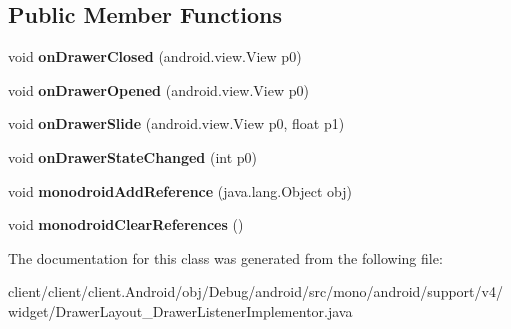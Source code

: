 \subsection*{Public Member Functions}
\begin{DoxyCompactItemize}
\item 
\hypertarget{classmono_1_1android_1_1support_1_1v4_1_1widget_1_1DrawerLayout__DrawerListenerImplementor_a19da95bb5c1e94a6af928960ad0ed455}{}void {\bfseries on\+Drawer\+Closed} (android.\+view.\+View p0)\label{classmono_1_1android_1_1support_1_1v4_1_1widget_1_1DrawerLayout__DrawerListenerImplementor_a19da95bb5c1e94a6af928960ad0ed455}

\item 
\hypertarget{classmono_1_1android_1_1support_1_1v4_1_1widget_1_1DrawerLayout__DrawerListenerImplementor_afca9c99baf632ae1efb1836cb29da6f4}{}void {\bfseries on\+Drawer\+Opened} (android.\+view.\+View p0)\label{classmono_1_1android_1_1support_1_1v4_1_1widget_1_1DrawerLayout__DrawerListenerImplementor_afca9c99baf632ae1efb1836cb29da6f4}

\item 
\hypertarget{classmono_1_1android_1_1support_1_1v4_1_1widget_1_1DrawerLayout__DrawerListenerImplementor_a9895b1e0ad123b4ba0bf63c1daa47da1}{}void {\bfseries on\+Drawer\+Slide} (android.\+view.\+View p0, float p1)\label{classmono_1_1android_1_1support_1_1v4_1_1widget_1_1DrawerLayout__DrawerListenerImplementor_a9895b1e0ad123b4ba0bf63c1daa47da1}

\item 
\hypertarget{classmono_1_1android_1_1support_1_1v4_1_1widget_1_1DrawerLayout__DrawerListenerImplementor_ad64490c0905c975d11975cd9c73a37a5}{}void {\bfseries on\+Drawer\+State\+Changed} (int p0)\label{classmono_1_1android_1_1support_1_1v4_1_1widget_1_1DrawerLayout__DrawerListenerImplementor_ad64490c0905c975d11975cd9c73a37a5}

\item 
\hypertarget{classmono_1_1android_1_1support_1_1v4_1_1widget_1_1DrawerLayout__DrawerListenerImplementor_ab223e0c04fc076ef1a6e6bd5edf64e9b}{}void {\bfseries monodroid\+Add\+Reference} (java.\+lang.\+Object obj)\label{classmono_1_1android_1_1support_1_1v4_1_1widget_1_1DrawerLayout__DrawerListenerImplementor_ab223e0c04fc076ef1a6e6bd5edf64e9b}

\item 
\hypertarget{classmono_1_1android_1_1support_1_1v4_1_1widget_1_1DrawerLayout__DrawerListenerImplementor_ad993dda0d0a5b7ea3f37e9200a1fd359}{}void {\bfseries monodroid\+Clear\+References} ()\label{classmono_1_1android_1_1support_1_1v4_1_1widget_1_1DrawerLayout__DrawerListenerImplementor_ad993dda0d0a5b7ea3f37e9200a1fd359}

\end{DoxyCompactItemize}


The documentation for this class was generated from the following file\+:\begin{DoxyCompactItemize}
\item 
client/client/client.\+Android/obj/\+Debug/android/src/mono/android/support/v4/widget/Drawer\+Layout\+\_\+\+Drawer\+Listener\+Implementor.\+java\end{DoxyCompactItemize}
